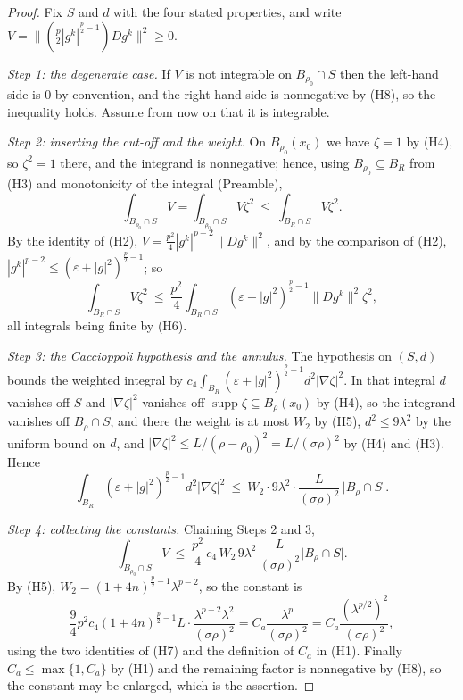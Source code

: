 \begin{proof}
Fix $S$ and $d$ with the four stated properties, and write
$V=\bigl\|(\tfrac p2|g^k|^{\frac p2-1})Dg^k\bigr\|^2\ge0$.

\emph{Step 1: the degenerate case.}  If $V$ is not integrable on
$B_{\rho_0}\cap S$ then the left-hand side is $0$ by convention, and the
right-hand side is nonnegative by (H8), so the inequality holds.  Assume from
now on that it is integrable.

\emph{Step 2: inserting the cut-off and the weight.}  On $B_{\rho_0}(x_0)$ we
have $\zeta=1$ by (H4), so $\zeta^2=1$ there, and the integrand is nonnegative;
hence, using $B_{\rho_0}\subseteq B_R$ from (H3) and monotonicity of the
integral (Preamble),
\[
\int_{B_{\rho_0}\cap S}V=\int_{B_{\rho_0}\cap S}V\zeta^2
\ \le\ \int_{B_R\cap S}V\zeta^2 .
\]
By the identity of (H2), $V=\tfrac{p^2}4|g^k|^{p-2}\|Dg^k\|^2$, and by the
comparison of (H2), $|g^k|^{p-2}\le(\varepsilon+|g|^2)^{\frac p2-1}$; so
\[
\int_{B_R\cap S}V\zeta^2
\ \le\ \frac{p^2}4\int_{B_R\cap S}(\varepsilon+|g|^2)^{\frac p2-1}\|Dg^k\|^2\zeta^2 ,
\]
all integrals being finite by (H6).

\emph{Step 3: the Caccioppoli hypothesis and the annulus.}  The hypothesis on
$(S,d)$ bounds the weighted integral by
$c_4\int_{B_R}(\varepsilon+|g|^2)^{\frac p2-1}d^2|\nabla\zeta|^2$.  In that
integral $d$ vanishes off $S$ and $|\nabla\zeta|^2$ vanishes off
$\operatorname{supp}\zeta\subseteq B_\rho(x_0)$ by (H4), so the integrand
vanishes off $B_\rho\cap S$, and there the weight is at most $W_2$ by (H5),
$d^2\le9\lambda^2$ by the uniform bound on $d$, and
$|\nabla\zeta|^2\le L/(\rho-\rho_0)^2=L/(\sigma\rho)^2$ by (H4) and (H3).
Hence
\[
\int_{B_R}(\varepsilon+|g|^2)^{\frac p2-1}d^2|\nabla\zeta|^2
\ \le\ W_2\cdot9\lambda^2\cdot\frac{L}{(\sigma\rho)^2}\,
  \bigl|B_\rho\cap S\bigr| .
\]

\emph{Step 4: collecting the constants.}  Chaining Steps 2 and 3,
\[
\int_{B_{\rho_0}\cap S}V
\ \le\ \frac{p^2}4\,c_4\,W_2\,9\lambda^2\,\frac{L}{(\sigma\rho)^2}\bigl|B_\rho\cap S\bigr| .
\]
By (H5), $W_2=(1+4n)^{\frac p2-1}\lambda^{p-2}$, so the constant is
\[
\frac94p^2c_4(1+4n)^{\frac p2-1}L\cdot\frac{\lambda^{p-2}\lambda^2}{(\sigma\rho)^2}
=C_a\frac{\lambda^{p}}{(\sigma\rho)^2}
=C_a\frac{(\lambda^{p/2})^2}{(\sigma\rho)^2},
\]
using the two identities of (H7) and the definition of $C_a$ in (H1).  Finally
$C_a\le\max\{1,C_a\}$ by (H1) and the remaining factor is nonnegative by (H8),
so the constant may be enlarged, which is the assertion.
\end{proof}
